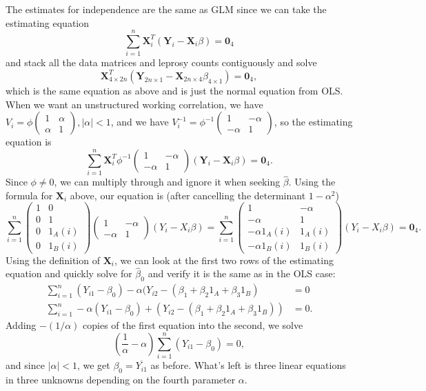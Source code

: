 \documentclass[11pt]{article}
\begin{document}
\begin{enumerate}
\begin{enumerate}
		The estimates for independence are the same as GLM since we can take the estimating equation
		\[
			\sum_{i=1}^n \bm{X}_i^T(\bm{Y}_i - \bm{X}_i\beta) = \bm{0}_4
		\]
		and stack all the data matrices and leprosy counts contiguously and solve
		\[
			\bm{X}_{4\times 2n}^T(\bm{Y}_{2n\times 1} - \bm{X}_{2n\times 4}\beta_{4\times 1}) = \bm{0}_4,
		\]
		which is the same equation as above and is just the normal equation from OLS. When we want an unstructured working correlation, we have $V_i = \phi \begin{pmatrix}
			1 & \alpha \\ \alpha & 1
		\end{pmatrix}, |\alpha|<1$, and we have $V_i^{-1} = \phi^{-1} \begin{pmatrix}
			1 & -\alpha \\ -\alpha & 1
		\end{pmatrix}$, so the estimating equation is
		\[
			\sum_{i=1}^n \bm{X}_i^T\phi^{-1}\begin{pmatrix}
			1 & -\alpha \\ -\alpha & 1
		\end{pmatrix}(\bm{Y}_i - \bm{X}_i\beta) = \bm{0}_4.
		\]
		Since $\phi\neq 0$, we can multiply through and ignore it when seeking $\widehat\beta$. Using the formula for $\bm{X}_i$ above, our equation is (after cancelling the determinant $1-\alpha^2$)
		\[
			\sum_{i=1}^n \begin{pmatrix}
				1 & 0\\
				0 & 1 \\
				0 & 1_A(i) \\
				0 & 1_B(i)
			\end{pmatrix} \begin{pmatrix}
			1 & -\alpha \\ -\alpha & 1\end{pmatrix} (Y_i - X_i\beta) = \sum_{i=1}^n\begin{pmatrix}
				1 & -\alpha\\
				-\alpha & 1 \\
				-\alpha1_A(i) & 1_A(i) \\
				-\alpha1_B(i) & 1_B(i)
			\end{pmatrix}(Y_i - X_i\beta) = \bm{0}_4.
		\]
		Using the definition of $\bm{X}_i$, we can look at the first two rows of the estimating equation and quickly solve for $\widehat\beta_0$ and verify it is the same as in the OLS case:
		\begin{align}
			\sum_{i=1}^n (Y_{i1} - \beta_0) - \alpha (Y_{i2} - (\beta_1 + \beta_2 1_A + \beta_3 1_B) &= 0 \\
			\sum_{i=1}^n -\alpha(Y_{i1} - \beta_0) + (Y_{i2} - (\beta_1 + \beta_2 1_A + \beta_3 1_B)) &= 0.
		\end{align}
		Adding $-(1/\alpha)$ copies of the first equation into the second, we solve
		\[
			\left(\frac{1}{\alpha} - \alpha\right) \sum_{i=1}^n (Y_{i1} - \beta_0)=0,
		\]
		and since $|\alpha|<1$, we get $\beta_0 = \overline{Y_{i1}}$ as before. What's left is three linear equations in three unknowns depending on the fourth parameter $\alpha$.
	\end{enumerate}
\end{enumerate}
\end{document}
